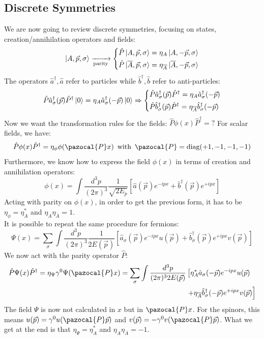 \documentclass[../main.tex]{subfiles}
\begin{document}
\subsection{Discrete Symmetries}
We are now going to review discrete symmetries, focusing on states, creation/annihilation  operators and fields:
\[
\ket{A,\Vec{p},\sigma}\xrightarrow[\text{parity}]{}\left\{
\begin{aligned}
&\hat{P}\ket{A,\Vec{p},\sigma}=\eta_A\ket{A,-\Vec{p},\sigma}\\
&\hat{P}\ket{\overline{A},\Vec{p},\sigma}=\eta_{\overline{A}}\ket{\overline{A},-\Vec{p},\sigma}
\end{aligned}
\right.
\]
The operators $\hat{a}^\dagger, \hat{a}$ refer to particles while $\hat{b}^\dagger, \hat{b}$ refer to anti-particles:
\[
\hat{P}\hat{a}^\dagger_\sigma(\Vec{p})\hat{P}^\dagger\ket{0}=\eta_A\hat{a}^\dagger_\sigma(-\Vec{p})\ket{0}\Rightarrow\left\{
\begin{aligned}
&\hat{P}\hat{a}^\dagger_\sigma(\Vec{p})\hat{P}^\dagger=\eta_A\hat{a}^\dagger_\sigma(-\Vec{p})\\
&\hat{P}\hat{b}^\dagger_\sigma(\Vec{p})\hat{P}^\dagger=\eta_{\overline{A}}\hat{b}^\dagger_\sigma(-\Vec{p})
\end{aligned}
\right.
\]
Now we want the transformation rules for the fields: $\hat{P}\phi(x)\hat{P}^\dagger=?$ For scalar fields, we have:
\[
\hat{P}\phi(x)\hat{P}^\dagger=\eta_\phi\phi(\pazocal{P}x) \, \text{ with } \, \pazocal{P}=\text{diag}(+1,-1,-1,-1)
\]
Furthermore, we know how to express the field $\phi(x)$ in terms of creation and annihilation operators:
\[
\phi(x)=\int \frac{d^3p}{(2\pi)^3}\frac{1}{\sqrt{2E_p}}\left[\hat{a}(\Vec{p})e^{-ipx}+\hat{b}^\dagger(\Vec{p})e^{+ipx}\right]
\]
Acting with parity on $\phi(x)$, in order to get the previous form, it has to be $\eta_\phi=\eta_A^*$ and $\eta_A\eta_{\overline{A}}=1$.\\
It is possible to repeat the same procedure for fermions:
\[
\Psi(x)=\sum_\sigma\int \frac{d^3p}{(2\pi)^3}\frac{1}{2E(\Vec{p})}\left[\hat{a}_\sigma(\Vec{p})e^{-ipx}u(\Vec{p})+\hat{b}^\dagger_\sigma(\Vec{p})e^{+ipx}v(\Vec{p})\right]
\]
We now act with the parity operator $\hat{P}$:
\begin{align*}
\hat{P}\Psi(x)\hat{P}^\dagger=\eta_\Psi\gamma^0\Psi(\pazocal{P}x)=\sum_\sigma\int \frac{d^3p}{(2\pi)^32E(\Vec{p})}&\left[\eta_A^*\hat{a}_\sigma(-\Vec{p})e^{-ipx}u(\Vec{p})\right.\\
&\left.+\eta_{\overline{A}}\hat{b}^\dagger_\sigma(-\Vec{p})e^{+ipx}v(\Vec{p})\right]
\end{align*}
The field $\Psi$ is now not calculated in $x$ but in $\pazocal{P}x$. For the spinors, this means $u(\Vec{p})=\gamma^0u(\pazocal{P}\Vec{p})$ and $v(\Vec{p})=-\gamma^0v(\pazocal{P}\Vec{p})$. What we get at the end is that $\eta_\Psi=\eta_A^*$ and $\eta_A\eta_{\overline{A}}=-1$.
\end{document}
